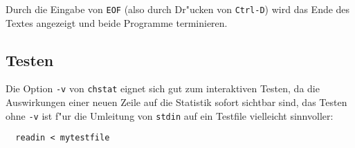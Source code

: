 Durch die Eingabe von {\tt EOF} (also durch Dr"ucken von {\tt Ctrl-D})
wird das Ende des Textes angezeigt und beide Programme terminieren.



\subsection*{Testen}

Die Option {\tt -v} von {\tt chstat} eignet sich gut zum interaktiven
Testen, da die Auswirkungen einer neuen Zeile auf die Statistik sofort
sichtbar sind, das Testen ohne {\tt -v} ist f"ur die Umleitung von
{\tt stdin} auf ein Testfile vielleicht sinnvoller:
\begin{verbatim}
  readin < mytestfile
\end{verbatim}

\osueguidelinesthree


